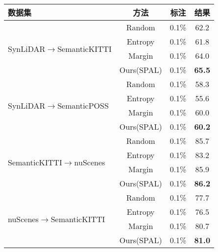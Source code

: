 \begin{table}[H]
	\renewcommand{\arraystretch}{1}
    \centering
    \setlength{\tabcolsep}{10mm}
    \label{tab:4-5}
    \wuhao
    \begin{tabular}{lccc}
        \toprule[1.5pt]
        \textbf{数据集} & \textbf{方法} & \textbf{标注} & \textbf{结果} \\
        \midrule
        \multirow{4}{*}{SynLiDAR\(\to\)SemanticKITTI} & 
        Random              & 0.1\%        & 62.2 \\
        ~ & Entropy             & 0.1\%        & 61.8 \\
        ~ & Margin              & 0.1\%        & 64.0 \\
        ~ & Ours(SPAL)          & 0.1\%        & \textbf{65.5} \\
        \multirow{4}{*}{SynLiDAR\(\to\)SemanticPOSS} & 
        Random              & 0.1\%        & 58.3 \\
        ~ & Entropy             & 0.1\%        & 55.6 \\
        ~ & Margin              & 0.1\%        & 60.0 \\
        ~ & Ours(SPAL)          & 0.1\%        & \textbf{60.2} \\
        \multirow{4}{*}{SemanticKITTI\(\to\)nuScenes} & 
        Random              & 0.1\%        & 85.7 \\
        ~ & Entropy             & 0.1\%        & 83.2 \\
        ~ & Margin              & 0.1\%        & 85.9 \\
        ~ & Ours(SPAL)          & 0.1\%        & \textbf{86.2} \\
        \multirow{4}{*}{nuScenes\(\to\)SemanticKITTI} & 
        Random              & 0.1\%        & 77.7 \\
        ~ & Entropy             & 0.1\%        & 76.5 \\
        ~ & Margin              & 0.1\%        & 80.7 \\
        ~ & Ours(SPAL)          & 0.1\%        & \textbf{81.0} \\
        \bottomrule[1.5pt]
    \end{tabular}
\end{table}